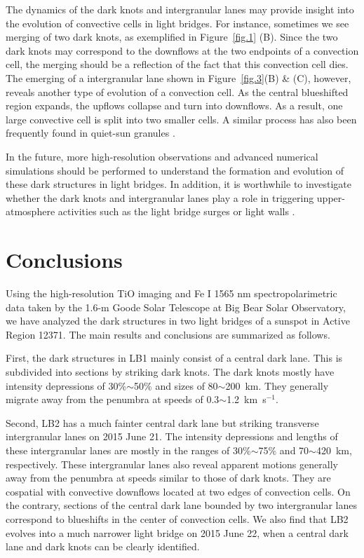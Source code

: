 \documentclass[preprint2]{aastex}
\begin{document}
The dynamics of the dark knots and intergranular lanes may provide insight into the evolution of convective cells in light bridges. For instance, sometimes we see merging of two dark knots, as exemplified in Figure~\ref{fig.1} (B). Since the two dark knots may correspond to the downflows at the two endpoints of a convection cell, the merging should be a reflection of the fact that this convection cell dies. The emerging of a intergranular lane shown in Figure~\ref{fig.3}(B) \& (C), however, reveals another type of evolution of a convection cell. As the central blueshifted region expands, the upflows collapse and turn into downflows. As a result, one large convective cell is split into two smaller cells. A similar process has also been frequently found in quiet-sun granules \citep[splitting or exploding granules; e.g., ][]{Ploner1999}.

In the future, more high-resolution observations and advanced numerical simulations should be performed to understand the formation and evolution of these dark structures in light bridges. In addition, it is worthwhile to investigate whether the dark knots and intergranular lanes play a role in triggering upper-atmosphere activities such as the light bridge surges or light walls \citep{Asai2001,Shimizu2009,Louis2014,Bharti2015,Yang2015,Toriumi2015a,Robustini2016,Yuan2016,Zhang2017,Hou2017,Tian2018}.

\section{Conclusions}

Using the high-resolution TiO imaging and Fe I 1565 nm spectropolarimetric data taken by the 1.6-m Goode Solar Telescope at Big Bear Solar Observatory, we have analyzed the dark structures in two light bridges of a sunspot in Active Region 12371. The main results and conclusions are summarized as follows.

First, the dark structures in LB1 mainly consist of a central dark lane. This is subdivided into sections by striking dark knots. The dark knots mostly have intensity depressions of  30\%$\sim$50\% and sizes of 80$\sim$200~km. They generally migrate away from the penumbra at speeds of 0.3$\sim$1.2~km~s$^{-1}$.

Second, LB2 has a much fainter central dark lane but striking transverse intergranular lanes on 2015 June 21. The intensity depressions and lengths of these intergranular lanes are mostly in the ranges of 30\%$\sim$75\% and 70$\sim$420~km, respectively. These intergranular lanes also reveal apparent motions generally away from the penumbra at speeds similar to those of dark knots. They are cospatial with convective downflows located at two edges of convection cells. On the contrary, sections of the central dark lane bounded by two intergranular lanes correspond to blueshifts in the center of convection cells. We also find that LB2 evolves into a much narrower light bridge on 2015 June 22, when a central dark lane and dark knots can be clearly identified.  
\end{document}
